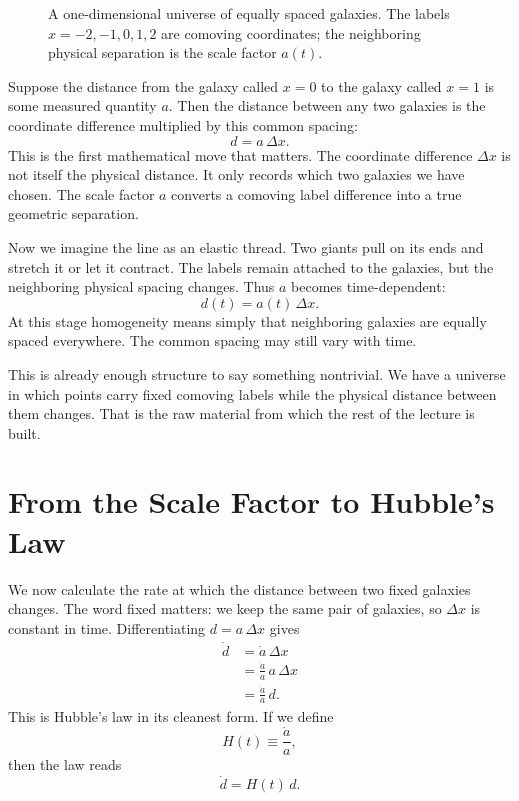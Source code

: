 \begin{figure}
\centering
{}
\caption{A one-dimensional universe of equally spaced galaxies. The labels \(x=-2,-1,0,1,2\) are comoving coordinates; the neighboring physical separation is the scale factor \(a(t)\).}
\end{figure}

Suppose the distance from the galaxy called \(x=0\) to the galaxy called \(x=1\) is some measured quantity \(a\). Then the distance between any two galaxies is the coordinate difference multiplied by this common spacing:
\begin{equation}
d=a\,\Delta x.
\end{equation}
This is the first mathematical move that matters. The coordinate difference \(\Delta x\) is not itself the physical distance. It only records which two galaxies we have chosen. The scale factor \(a\) converts a comoving label difference into a true geometric separation.

Now we imagine the line as an elastic thread. Two giants pull on its ends and stretch it or let it contract. The labels remain attached to the galaxies, but the neighboring physical spacing changes. Thus \(a\) becomes time-dependent:
\begin{equation}
d(t)=a(t)\,\Delta x.
\end{equation}
At this stage homogeneity means simply that neighboring galaxies are equally spaced everywhere. The common spacing may still vary with time.

This is already enough structure to say something nontrivial. We have a universe in which points carry fixed comoving labels while the physical distance between them changes. That is the raw material from which the rest of the lecture is built.

\section{From the Scale Factor to Hubble's Law}

We now calculate the rate at which the distance between two fixed galaxies changes. The word fixed matters: we keep the same pair of galaxies, so \(\Delta x\) is constant in time. Differentiating \(d=a\,\Delta x\) gives
\begin{align}
\dot d &= \dot a\,\Delta x \\
       &= \frac{\dot a}{a}\,a\,\Delta x \\
       &= \frac{\dot a}{a}\,d.
\end{align}
This is Hubble's law in its cleanest form. If we define
\begin{equation}
H(t)\equiv \frac{\dot a}{a},
\end{equation}
then the law reads
\begin{equation}
\dot d = H(t)\,d.
\end{equation}

